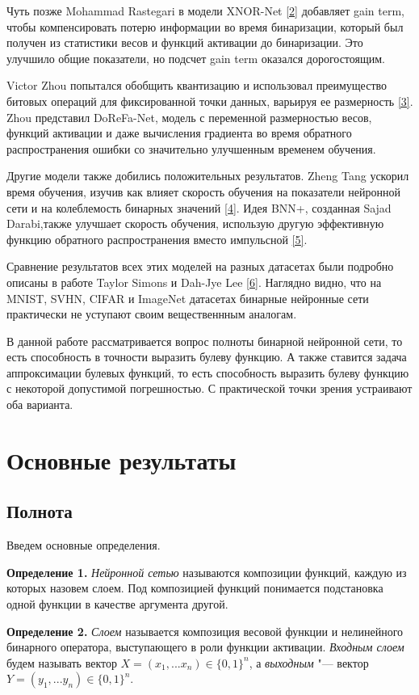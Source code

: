 \documentclass[a4paper, 14pt]{extarticle}
\begin{document}
    Чуть позже Mohammad Rastegari в модели XNOR-Net \hyperlink{p2}{[2]} добавляет gain term, чтобы компенсировать потерю информации во время бинаризации, который был получен из статистики весов и функций активации до бинаризации. Это улучшило общие показатели, но подсчет gain term оказался дорогостоящим.
    
    Victor Zhou попытался обобщить квантизацию и использовал преимущество битовых операций для фиксированной точки данных, варьируя ее размерность \hyperlink{p3}{[3]}. Zhou представил DoReFa-Net, модель с переменной размерностью весов, функций активации и даже вычисления градиента во время обратного распространения ошибки со значительно улучшенным временем обучения.
    
    Другие модели также добились положительных результатов. Zheng Tang ускорил время обучения, изучив как влияет скорость обучения на показатели нейронной сети и на колеблемость бинарных значений \hyperlink{p4}{[4]}. Идея BNN+, созданная Sajad Darabi,также улучшает скорость обучения, использую другую эффективную функцию обратного распространения вместо импульсной \hyperlink{p5}{[5]}.
    
    Сравнение результатов всех этих моделей на разных датасетах были подробно описаны в работе Taylor Simons и Dah-Jye Lee \hyperlink{p6}{[6]}. Наглядно видно, что на MNIST, SVHN, CIFAR и ImageNet датасетах бинарные нейронные сети практически не уступают своим вещественнным аналогам.
    
    В данной работе рассматривается вопрос полноты бинарной нейронной сети, то есть способность в точности выразить булеву функцию. А также ставится задача аппроксимации булевых функций, то есть способность выразить булеву функцию с некоторой допустимой погрешностью. С практической точки зрения устраивают оба варианта.
\newpage


\section{Основные результаты}
\subsection{Полнота}
    Введем основные определения.
    
    \textbf{Определение 1.} \emph{Нейронной сетью} называются композиции функций, каждую из которых назовем слоем. Под композицией функций понимается подстановка одной функции в качестве аргумента другой.
    
    \textbf{Определение 2.} \emph{Слоем} называется композиция весовой функции и нелинейного бинарного оператора, выступающего в роли функции активации. \emph{Входным слоем} будем называть вектор $X = (x_1, ... x_n)\in \{0, 1\}^n$, а \emph{выходным} "--- вектор $Y = (y_1, ... y_n)\in \{0, 1\}^n$.
    
\end{document}
